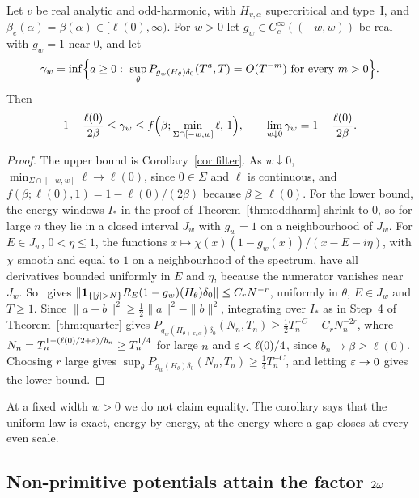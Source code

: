 \begin{corollary}\label{cor:window}
Let $v$ be real analytic and odd-harmonic, with $H_{v,\alpha}$ supercritical and type~I, and $\beta_e(\alpha)=\beta(\alpha)\in[\ell(0),\infty)$. For $w>0$ let $g_w\in C_c^\infty((-w,w))$ be real with $g_w=1$ near $0$, and let
\[
\gamma_w=\inf\Bigl\{a\ge0:\ \sup_\theta P_{g_w(H_\theta)\delta_0}(T^a,T)=O(T^{-m})\text{ for every }m>0\Bigr\}.
\]
Then
\[
1-\frac{\ell(0)}{2\beta}\le\gamma_w\le f\Bigl(\beta;\min_{\Sigma\cap[-w,w]}\ell,\,1\Bigr),\qquad\lim_{w\downarrow0}\gamma_w=1-\frac{\ell(0)}{2\beta}.
\]
\end{corollary}

\begin{proof}
The upper bound is Corollary~\ref{cor:filter}. As $w\downarrow0$, $\min_{\Sigma\cap[-w,w]}\ell\to\ell(0)$, since $0\in\Sigma$ and $\ell$ is continuous, and $f(\beta;\ell(0),1)=1-\ell(0)/(2\beta)$ because $\beta\ge\ell(0)$. For the lower bound, the energy windows $I_*$ in the proof of Theorem~\ref{thm:oddharm} shrink to $0$, so for large $n$ they lie in a closed interval $J_w$ with $g_w=1$ on a neighbourhood of $J_w$. For $E\in J_w$, $0<\eta\le1$, the functions $x\mapsto\chi(x)(1-g_w(x))/(x-E-i\eta)$, with $\chi$ smooth and equal to $1$ on a neighbourhood of the spectrum, have all derivatives bounded uniformly in $E$ and $\eta$, because the numerator vanishes near $J_w$. So~\cite[Lemma~2.8]{DMuniv} gives $\|\un_{\{|j|>N\}}R_E(1-g_w)(H_\theta)\delta_0\|\le C_rN^{-r}$, uniformly in $\theta$, $E\in J_w$ and $T\ge1$. Since $\|a-b\|^2\ge\frac12\|a\|^2-\|b\|^2$, integrating over $I_*$ as in Step~4 of Theorem~\ref{thm:quarter} gives $P_{g_w(H_{\theta+x_n\alpha})\delta_0}(N_n,T_n)\ge\frac12T_n^{-C}-C_rN_n^{-2r}$, where $N_n=T_n^{1-(\ell(0)/2+\varepsilon)/b_n}\ge T_n^{1/4}$ for large $n$ and $\varepsilon<\ell(0)/4$, since $b_n\to\beta\ge\ell(0)$. Choosing $r$ large gives $\sup_\theta P_{g_w(H_\theta)\delta_0}(N_n,T_n)\ge\frac14T_n^{-C}$, and letting $\varepsilon\to0$ gives the lower bound.
\end{proof}

At a fixed width $w>0$ we do not claim equality. The corollary says that the uniform law is exact, energy by energy, at the energy where a gap closes at every even scale.

\subsection{Non-primitive potentials attain the factor \texorpdfstring{$2\omega$}{2 omega}}

